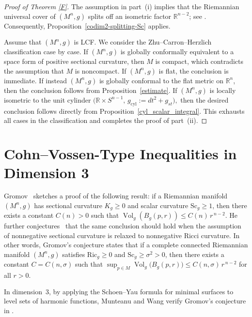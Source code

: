 \documentclass[12pt,oneside,a4paper]{article}
\theoremstyle{mytheorem}
\theoremstyle{remark}
\begin{document}
\begin{proof}[Proof of Theorem \ref{F}]
The assumption in part~(i) implies that the Riemannian universal cover of $(M^n,g)$
splits off an isometric factor $\mathbb{R}^{n-2}$; see \cite[Theorem~1.2]{2026arXiv260114231C}.
Consequently, Proposition~\ref{codim2-splitting-Sc} applies.

Assume that $(M^n,g)$ is LCF. We consider the Zhu–Carron–Herzlich classification case by case. If $(M^n,g)$ is globally conformally equivalent to a space form of positive
sectional curvature, then $M$ is compact, which contradicts the assumption that
$M$ is noncompact.  If $(M^n,g)$ is flat, the conclusion is immediate. If instead $(M^n,g)$ is globally conformal to the flat metric on $\mathbb{R}^n$,
then the conclusion follows from Proposition~\ref{estimate}.
If $(M^n,g)$ is locally isometric to the unit cylinder
$\bigl(\mathbb{R}\times S^{n-1},\, g_{\mathrm{cyl}}:=dt^2+g_{st}\bigr),$
then the desired conclusion follows directly from
Proposition~\ref{cyl_scalar_integral}.
This exhausts all cases in the classification and completes the proof of
part~(ii).
\end{proof}









\section{Cohn--Vossen-Type Inequalities  in Dimension 3}\label{dim 3}
 Gromov~\cite[2.B.]{zbMATH03969577} sketches a proof of the following result: if a Riemannian manifold $(M^n,g)$ has sectional curvature $K_g \ge 0$ and scalar curvature $\mathrm{Sc}_g \ge 1$, then there exists a constant $C(n)>0$ such that $\operatorname{Vol}_g(B_g(p,r)) \le C(n)\, r^{\,n-2}.$
He further conjectures~\cite[2.A.(b)]{zbMATH03969577} that the same conclusion should hold when the assumption of nonnegative sectional curvature is relaxed to nonnegative Ricci curvature. In other words, Gromov’s conjecture states that if a complete connected Riemannian manifold $(M^n,g)$ satisfies $\mathrm{Ric}_g \ge 0$ and $\mathrm{Sc}_g \ge \sigma^2 > 0$, then there exists a constant $C = C(n,\sigma)$ such that
$\sup_{p \in M} \operatorname{Vol}_g\big(B_g(p,r)\big) \le C(n,\sigma)\, r^{\,n-2}$
for all  $r>0$.





In dimension~$3$, by applying the Schoen--Yau formula for minimal surfaces to level sets of harmonic functions, Munteanu and Wang verify Gromov’s conjecture in \cite[Theorem~1.2]{2022arXiv220105595M}.   
\end{document}
